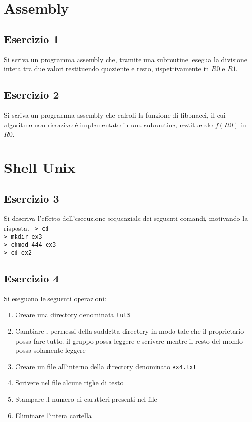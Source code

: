 \documentclass{article}
\def\code#1{\texttt{#1}}
\begin{document}
\section*{Assembly}
\subsection*{Esercizio 1}
Si scriva un programma assembly che, tramite una subroutine, esegua la divisione intera tra due valori restituendo quoziente e resto, rispettivamente in $R0$ e $R1$.

\subsection*{Esercizio 2}
Si scriva un programma assembly che calcoli la funzione di fibonacci, il cui algoritmo non ricorsivo è implementato in una subroutine, restituendo $f(R0)$ in $R0$.

\section*{Shell Unix}
\subsection*{Esercizio 3}
Si descriva l'effetto dell'esecuzione sequenziale dei seguenti comandi, motivando la risposta.
\newline
\code{
> cd\\
> mkdir ex3\\
> chmod 444 ex3\\
> cd ex2
}

\subsection*{Esercizio 4}
Si eseguano le seguenti operazioni:
\begin{enumerate}
\item Creare una directory denominata \code{tut3}
\item Cambiare i permessi della suddetta directory in modo tale che il proprietario possa fare tutto, il gruppo possa leggere e scrivere mentre il resto del mondo possa solamente leggere
\item Creare un file all'interno della directory denominato \code{ex4.txt}
\item Scrivere nel file alcune righe di testo
\item Stampare il numero di caratteri presenti nel file
\item Eliminare l'intera cartella
\end{enumerate}
\end{document}
